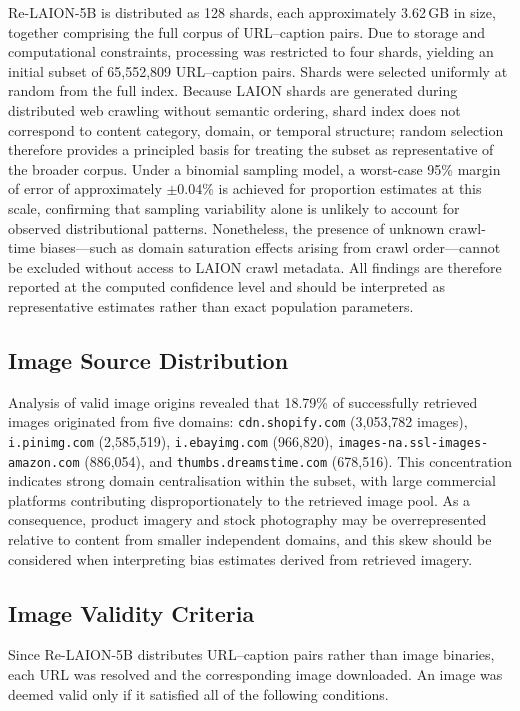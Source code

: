 Re-LAION-5B is distributed as 128 shards, each approximately 3.62\,GB in size, together comprising the full corpus of URL--caption pairs. Due to storage and computational constraints, processing was restricted to four shards, yielding an initial subset of 65,552,809 URL--caption pairs. Shards were selected uniformly at random from the full index. Because LAION shards are generated during distributed web crawling without semantic ordering, shard index does not correspond to content category, domain, or temporal structure; random selection therefore provides a principled basis for treating the subset as representative of the broader corpus. Under a binomial sampling model, a worst-case 95\% margin of error of approximately $\pm 0.04\%$ is achieved for proportion estimates at this scale, confirming that sampling variability alone is unlikely to account for observed distributional patterns. Nonetheless, the presence of unknown crawl-time biases---such as domain saturation effects arising from crawl order---cannot be excluded without access to LAION crawl metadata. All findings are therefore reported at the computed confidence level and should be interpreted as representative estimates rather than exact population parameters.

\subsection{Image Source Distribution}

Analysis of valid image origins revealed that 18.79\% of successfully retrieved images originated from five domains: \texttt{cdn.shopify.com} (3,053,782 images), \texttt{i.pinimg.com} (2,585,519), \texttt{i.ebayimg.com} (966,820), \texttt{images-na.ssl-images-amazon.com} (886,054), and \texttt{thumbs.dreamstime.com} (678,516). This concentration indicates strong domain centralisation within the subset, with large commercial platforms contributing disproportionately to the retrieved image pool. As a consequence, product imagery and stock photography may be overrepresented relative to content from smaller independent domains, and this skew should be considered when interpreting bias estimates derived from retrieved imagery.

\subsection{Image Validity Criteria}

Since Re-LAION-5B distributes URL--caption pairs rather than image binaries, each URL was resolved and the corresponding image downloaded. An image was deemed valid only if it satisfied all of the following conditions.

